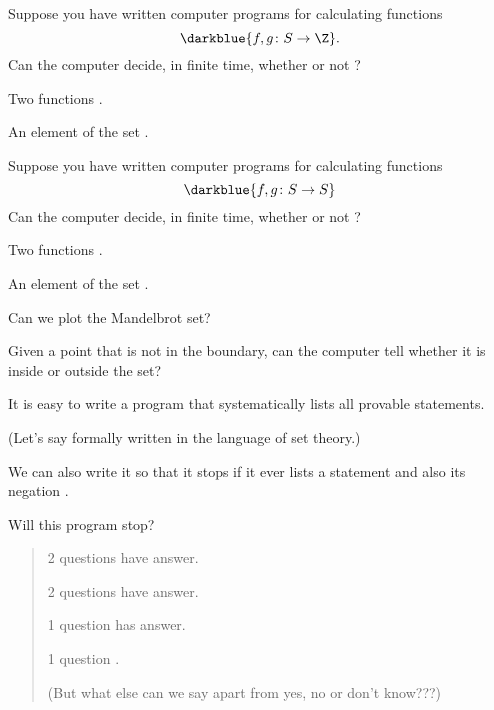 \documentclass%
[%
Screen4to3,
]{foils}
\begin{document}
\vfill


Suppose you have written computer programs for calculating functions
\[
\darkblue{f, g \colon S \to \Z}.
\]
Can the computer decide, in finite time, whether or not ?


\vfill
{} Two functions .

 An element of the set .

\vfill


Suppose you have written computer programs for calculating functions
\[
\darkblue{f, g \colon S \to S}
\]
Can the computer decide, in finite time, whether or not ?


\vfill
{} Two functions .

 An element of the set .

\vfill


Can we plot the Mandelbrot set?

Given a point that is not in the boundary, can the computer tell
whether it is inside or outside the set?


It is easy to write a program that systematically lists all provable
statements.

 (Let's say formally written in the language of set theory.)

\vfill

We can also write it so that it stops if it ever lists a statement  and also its negation . 

\vfill

Will this program stop? 

\vfill


\begin{quote}
2 questions have  answer.

2 questions have  answer. 

1 question has  answer. 

1 question .

\quad (But what else can we say apart from yes, no or don't know???)
\end{quote}
\end{document}
